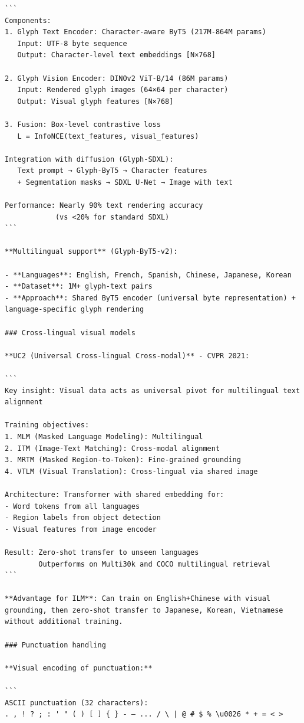 \documentclass[11pt]{article}
\begin{document}
\begin{verbatim}
```
Components:
1. Glyph Text Encoder: Character-aware ByT5 (217M-864M params)
   Input: UTF-8 byte sequence
   Output: Character-level text embeddings [N×768]

2. Glyph Vision Encoder: DINOv2 ViT-B/14 (86M params)
   Input: Rendered glyph images (64×64 per character)
   Output: Visual glyph features [N×768]

3. Fusion: Box-level contrastive loss
   L = InfoNCE(text_features, visual_features)
   
Integration with diffusion (Glyph-SDXL):
   Text prompt → Glyph-ByT5 → Character features
   + Segmentation masks → SDXL U-Net → Image with text

Performance: Nearly 90% text rendering accuracy
            (vs <20% for standard SDXL)
```

**Multilingual support** (Glyph-ByT5-v2):

- **Languages**: English, French, Spanish, Chinese, Japanese, Korean
- **Dataset**: 1M+ glyph-text pairs
- **Approach**: Shared ByT5 encoder (universal byte representation) + language-specific glyph rendering

### Cross-lingual visual models

**UC2 (Universal Cross-lingual Cross-modal)** - CVPR 2021:

```
Key insight: Visual data acts as universal pivot for multilingual text alignment

Training objectives:
1. MLM (Masked Language Modeling): Multilingual
2. ITM (Image-Text Matching): Cross-modal alignment
3. MRTM (Masked Region-to-Token): Fine-grained grounding
4. VTLM (Visual Translation): Cross-lingual via shared image

Architecture: Transformer with shared embedding for:
- Word tokens from all languages
- Region labels from object detection
- Visual features from image encoder

Result: Zero-shot transfer to unseen languages
        Outperforms on Multi30k and COCO multilingual retrieval
```

**Advantage for ILM**: Can train on English+Chinese with visual grounding, then zero-shot transfer to Japanese, Korean, Vietnamese without additional training.

### Punctuation handling

**Visual encoding of punctuation:**

```
ASCII punctuation (32 characters):
. , ! ? ; : ' " ( ) [ ] { } - — ... / \ | @ # $ % \u0026 * + = < >


\end{verbatim}
\end{document}
